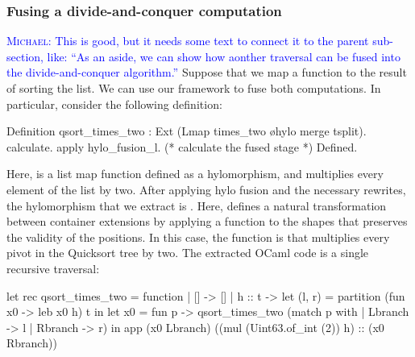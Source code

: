 \documentclass[ a4paper, UKenglish, cleveref, autoref, thm-restate]{lipics-v2021}
\newcommand{\mvol}[1]{\textcolor{blue}{\textsc{Michael}: #1}}
\begin{document}
\subsubsection{Fusing a divide-and-conquer computation}
\mvol{This is good, but it needs some text to connect it to the parent sub-section,
  like: ``As an aside, we can show how aonther traversal can be fused into the divide-and-conquer
  algorithm.''}
Suppose that we map a function to the result of sorting the list. We can
use our framework to fuse both computations. In particular, consider
the following definition:
\begin{coqcode}
Definition qsort_times_two : Ext (Lmap times_two \o hylo merge tsplit).
  calculate.  apply hylo_fusion_l. 
  (* calculate the fused stage *)
Defined.
\end{coqcode}
Here,  is a list map function defined as a hylomorphism,
and  multiplies every element of the list by two.
After applying hylo fusion and the necessary rewrites, the hylomorphism that we
extract is 
. Here,  defines
a natural transformation between container extensions by applying a function
to the shapes that preserves the validity of the positions. In this case,
the function is  that multiplies every pivot in the Quicksort
tree by two. The extracted OCaml code is a single recursive traversal:
\begin{ocamlcode}
let rec qsort_times_two = function
| [] -> []
| h :: t ->
  let (l, r) = partition (fun x0 -> leb x0 h) t in
  let x0 = fun p -> qsort_times_two (match p with
                                     | Lbranch -> l
                                     | Rbranch -> r) in
  app (x0 Lbranch) ((mul (Uint63.of_int (2)) h) :: (x0 Rbranch))
\end{ocamlcode}
\end{document}
